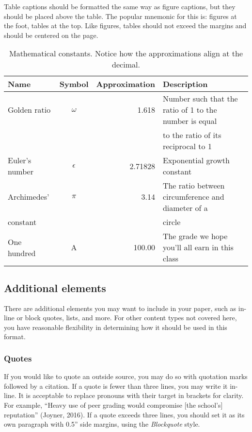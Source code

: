 Table captions should be formatted the same way as figure captions, but they should be placed above the table. The popular mnemonic for this is: figures at the foot, tables at the top. Like figures, tables should not exceed the margins and should be centered on the page.

\begin{table}[H]
  \centering
  \caption{Mathematical constants. Notice how the approximations align at the decimal.}
  \label{table:1}
  \begin{tabular}{@{}lcrl@{}}
    \textbf{Name} & \textbf{Symbol} & \textbf{Approximation} & \textbf{Description}\\
    \midrule
    Golden ratio & $\omega$ & 1.618 & Number such that the ratio of 1 to the number is equal\\
    & & & to the ratio of its reciprocal to 1\\
    \midrule
    Euler's number & $\epsilon$ & 2.71828 & Exponential growth constant\\
    \midrule
    Archimedes' & $\pi$ & 3.14 & The ratio between circumference and diameter of a\\
    constant & & & circle\\
    \midrule
    One hundred & A\super{+} & 100.00 & The grade we hope you'll all earn in this class
  \end{tabular}
\end{table}

\subsection{Additional elements}
There are additional elements you may want to include in your paper, such as in-line or block quotes, lists, and more. For other content types not covered here, you have reasonable flexibility in determining how it should be used in this format.

\subsubsection{Quotes}
If you would like to quote an outside source, you may do so with quotation marks followed by a citation. If a quote is fewer than three lines, you may write it in-line. It is acceptable to replace pronouns with their target in brackets for clarity. For example, “Heavy use of peer grading would compromise [the school’s] reputation” (Joyner, 2016). If a quote exceeds three lines, you should set it as its own paragraph with 0.5'' side margins, using the \emph{Blockquote} style.

